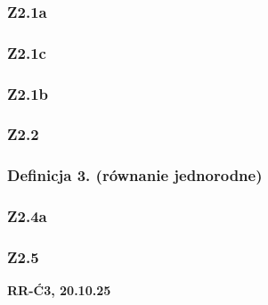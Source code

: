 \documentclass[10pt,a4paper]{article}
\newcommand{\zagadnienie}[3]{%
    \clearpage %
    \noindent\textbf{#1} #2\\
    #3
}
\begin{document}
{    \subsubsection*{Z2.1a}
    \begin{quote}
    \end{quote}

    \subsubsection*{Z2.1c}
    \begin{quote}
    \end{quote}

    \subsubsection*{Z2.1b}
    \begin{quote}
    \end{quote}

    \subsubsection*{Z2.2}
    \begin{quote}
    \end{quote}

    \begin{tcolorbox}[mybox]
    \subsubsection*{Definicja 3. (równanie jednorodne)}
    \begin{quote}
    \end{quote}
    \end{tcolorbox}

    \subsubsection*{Z2.4a}
    \begin{quote}
    \end{quote}

    \subsubsection*{Z2.5}
    \begin{quote}
    \end{quote}
}
\zagadnienie{RR-Ć3, 20.10.25}{}
\end{document}
